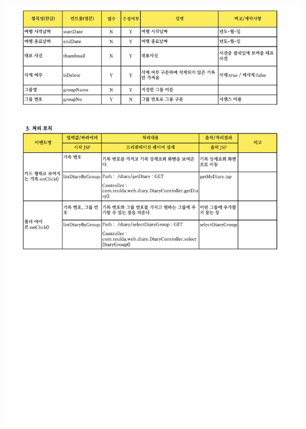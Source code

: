 {{{{{{{{{{{{{{{{{{{{{{{{{{{{{{{{{{{{{{{\includegraphics[width=20cm]{./Figure/Design/Display/diary/diary_21.pdf} \\
}}}}}}}}}}}}}}}}}}}}}}}}}}}}}}}}}}}}}}}
